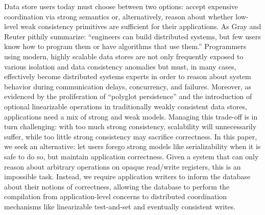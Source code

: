 Data store users today must choose between two options: accept
expensive coordination via strong semantics or, alternatively, reason
about whether low-level weak consistency primitives are sufficient for
their applications. As Gray and Reuter pithily summarize: ``engineers
can build distributed systems, but few users know how to program them
or have algorithms that use them.'' Programmers using modern, highly
scalable data stores are not only frequently exposed to various
isolation and data consistency anomalies but must, in many cases,
effectively become distributed systems experts in order to reason
about system behavior during communication delays, concurrency, and
failures. Moreover, as evidenced by the proliferation of ``polyglot
persistence'' and the introduction of optional linearizable operations
in traditionally weakly consistent data stores, applications need a
mix of strong and weak models. Managing this trade-off is in turn
challenging: with too much strong consistency, scalability will
unnecessarily suffer, while too little strong consistency may
sacrifice correctness. In this paper, we seek an alternative: let
users forego strong models like serializability when it is safe to do
so, but maintain application correctness. Given a system that can only
reason about arbitrary operations on opaque read/write registers, this
is an impossible task. Instead, we require application writers to
inform the database about their notions of correctness, allowing the
database to perform the compilation from application-level concerns to
distributed coordination mechanisms like linearizable test-and-set and
eventually consistent writes.


